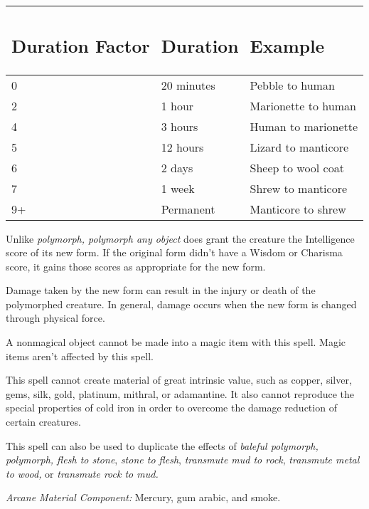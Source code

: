 \documentclass{article}
\begin{document}
\vspace{12pt}
\begin{tabular}{|>{\raggedright}p{38pt}|>{\raggedright}p{47pt}|>{\raggedright}p{88pt}|}
\hline
\subsection*{D\textbf{uration Factor}} & \subsection*{D\textbf{uration}} & \subsection*{E\textbf{xample}}\tabularnewline
\hline
0 & 20 minutes & Pebble to human\tabularnewline
\hline
2 & 1 hour & Marionette to human\tabularnewline
\hline
4 & 3 hours & Human to marionette\tabularnewline
\hline
5 & 12 hours & Lizard to manticore\tabularnewline
\hline
6 & 2 days & Sheep to wool coat\tabularnewline
\hline
7 & 1 week & Shrew to manticore\tabularnewline
\hline
9+ & Permanent & Manticore to shrew\tabularnewline
\hline
\end{tabular}

Unlike \textit{polymorph, polymorph any object }does grant the creature the Intelligence 
score of its new form. If the original form didn't have a Wisdom or Charisma score, 
it gains those scores as appropriate for the new form.

Damage taken by the new form can result in the injury or death of the polymorphed 
creature. In general, damage occurs when the new form is changed through physical 
force.

A nonmagical object cannot be made into a magic item with this spell. Magic items 
aren't affected by this spell.

This spell cannot create material of great intrinsic value, such as copper, silver, 
gems, silk, gold, platinum, mithral, or adamantine. It also cannot reproduce the 
special properties of cold iron in order to overcome the damage reduction of certain 
creatures.

This spell can also be used to duplicate the effects of \textit{baleful polymorph, 
polymorph, flesh to stone}, \textit{stone to flesh}, \textit{transmute mud to rock}, 
\textit{transmute metal to wood, }or \textit{transmute rock to mud.}

\textit{Arcane Material Component: }Mercury, gum arabic, and smoke.
\end{document}
